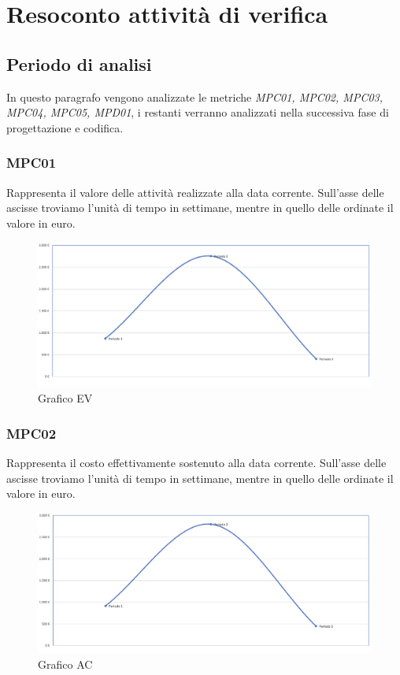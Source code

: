 \section{Resoconto attività di verifica}
\subsection{Periodo di analisi}
In questo paragrafo vengono analizzate le metriche \textit{MPC01, MPC02, MPC03, MPC04, MPC05, MPD01}, i restanti verranno analizzati nella successiva fase di progettazione e codifica.
\subsubsection{MPC01}
Rappresenta il valore delle attività realizzate alla data corrente.
Sull'asse delle ascisse troviamo l'unità di tempo in settimane, mentre in quello delle ordinate il valore in euro.
\begin{figure}[H]
\centering
\includegraphics[width=1\textwidth]{src/img/grafico_EV.png}
\caption{Grafico EV}
\end{figure}

\subsubsection{MPC02}
Rappresenta il costo effettivamente sostenuto alla data corrente.
Sull'asse delle ascisse troviamo l'unità di tempo in settimane, mentre in quello delle ordinate il valore in euro.
\begin{figure}[H]
\centering
\includegraphics[width=1\textwidth]{src/img/grafico_AC.png}
\caption{Grafico AC}
\end{figure}

